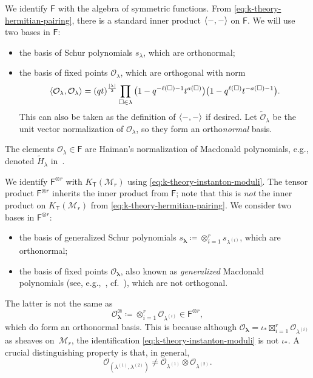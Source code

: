 \documentclass[10pt,a4paper]{amsart}
\numberwithin{equation}{section}
\renewcommand{\vec}[1]{\bm{#1}}
\renewcommand{\tilde}[1]{\widetilde{#1}}
\newcommand{\cM}{\mathcal{M}}
\newcommand{\cO}{\mathcal{O}}
\newcommand{\sF}{\mathsf{F}}
\newcommand{\sT}{\mathsf{T}}
\DeclarePairedDelimiter{\inner}{\langle}{\rangle}
\begin{document}
\begin{MyParagraph}\label{sec:instanton-moduli-bases}
We identify $\sF$ with the algebra of symmetric functions. From
\eqref{eq:k-theory-hermitian-pairing}, there is a standard inner
product $\inner{-, -}$ on $\sF$. We will use two bases in $\sF$:
\begin{itemize}\itemsep=0pt
\item the basis of Schur polynomials $s_\lambda$, which are
 orthonormal;
\item the basis of fixed points $\cO_\lambda$, which are orthogonal
 with norm
 \[ \inner{\cO_\lambda, \cO_\lambda} = (qt)^{\frac{|\lambda|}{2}} \prod_{\square \in \lambda} \big(1 - q^{-\ell(\square)-1} t^{a(\square)}\big) \big(1 - q^{\ell(\square)} t^{-a(\square)-1}\big). \]
 This can also be taken as the definition of $\inner{-, -}$ if
 desired. Let $\tilde\cO_\lambda$ be the unit vector normalization of
 $\cO_\lambda$, so they form an ortho{\it normal} basis.
\end{itemize}
The elements $\cO_\lambda \in \sF$ are Haiman's normalization of
Macdonald polynomials, e.g., denoted $\tilde H_\lambda$ in~\cite{Haiman1999}.
\end{MyParagraph}

\begin{MyParagraph}\label{sec:fixed-point-vs-naive-rank-r-basis}
We identify $\sF^{\otimes r}$ with $K_\sT(\cM_r)$ using
\eqref{eq:k-theory-instanton-moduli}. The tensor product
$\sF^{\otimes r}$ inherits the inner product from $\sF$; note that
this is {\it not} the inner product on $K_\sT(\cM_r)$ from
\eqref{eq:k-theory-hermitian-pairing}. We consider two bases in
$\sF^{\otimes r}$:
\begin{itemize}\itemsep=0pt
\item the basis of generalized Schur polynomials
 $s_{\vec\lambda} \coloneqq \otimes_{i=1}^r s_{\lambda^{(i)}}$, which
 are orthonormal;
\item the basis of fixed points $\cO_{\vec\lambda}$, also known as
 {\it generalized} Macdonald polynomials (see, e.g.,~\cite{Awata2016},
 cf.~\cite{Smirnov2014}), which are not orthogonal.
\end{itemize}
The latter is not the same as
\[ \cO^{\otimes}_{\vec\lambda} \coloneqq \otimes_{i=1}^r \cO_{\lambda^{(i)}} \in \sF^{\otimes r}, \]
which do form an orthonormal basis. This is because although
$\cO_{\vec\lambda} = \iota_* \boxtimes_{i=1}^r \cO_{\lambda^{(i)}}$ as
sheaves on~$\cM_r$, the identification
\eqref{eq:k-theory-instanton-moduli} is not $\iota_*$. A crucial
distinguishing property is that, in general,
\[ \cO_{(\lambda^{(1)}, \lambda^{(2)})} \neq \cO_{\lambda^{(1)}} \otimes \cO_{\lambda^{(2)}}. \]
\end{MyParagraph}
\end{document}
